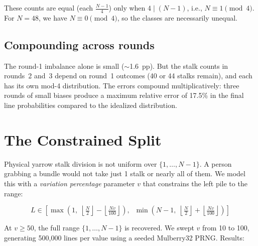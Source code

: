 \documentclass{article}
\begin{document}
These counts are equal (each $\frac{N-1}{4}$) only when $4 \mid (N-1)$, i.e., $N \equiv 1 \pmod{4}$. For $N = 48$, we have $N \equiv 0 \pmod{4}$, so the classes are necessarily unequal.

\subsection{Compounding across rounds}

The round-1 imbalance alone is small ($\sim$1.6~pp). But the stalk counts in rounds~2 and~3 depend on round~1 outcomes (40 or 44 stalks remain), and each has its own mod-4 distribution. The errors compound multiplicatively: three rounds of small biases produce a maximum relative error of 17.5\% in the final line probabilities compared to the idealized distribution.

\section{The Constrained Split}\label{sec:constrained}

Physical yarrow stalk division is not uniform over $\{1, \ldots, N-1\}$. A person grabbing a bundle would not take just 1 stalk or nearly all of them. We model this with a \textit{variation percentage} parameter $v$ that constrains the left pile to the range:

\begin{equation}
L \in \left[\max\!\left(1,\; \left\lfloor\tfrac{N}{2}\right\rfloor - \left\lfloor\tfrac{Nv}{100}\right\rfloor\right),\;\; \min\!\left(N{-}1,\; \left\lfloor\tfrac{N}{2}\right\rfloor + \left\lfloor\tfrac{Nv}{100}\right\rfloor\right)\right]
\end{equation}

At $v \geq 50$, the full range $\{1, \ldots, N-1\}$ is recovered. We swept $v$ from 10 to 100, generating 500{,}000 lines per value using a seeded Mulberry32 PRNG. Results:
\end{document}
